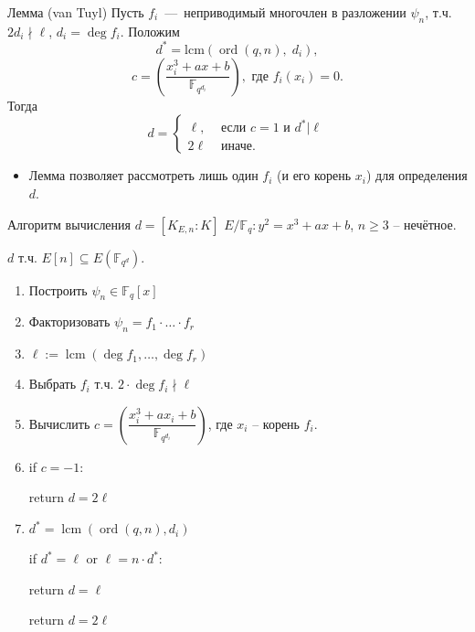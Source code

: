 \documentclass{beamer}
\begin{document}
\begin{frame}%
\begin{block}{Лемма (van Tuyl)}
    Пусть $f_i$~---~неприводимый многочлен в разложении ${\psi _n}$, т.ч. $2 d_i \nmid \ell$, $d_i = \deg f_i$. Положим
    \[
    {d^*} = \mathrm{lcm}( {\operatorname{ord} ( {q,n} ),\;{d_i}} ),
    \]
    \[
    c = \left(\frac{x_i^3 + a x + b}{\mathbb{F}_{q^{d_i}}} \right),{\text{ где }} f_i( x_i ) = 0.
    \]
    Тогда
    $$
    d = 
    \begin{cases}
        \ell, &\text{ если } c=1 \text{ и } d^*| \ell  \\
        2\ell & \text{ иначе. }
    \end{cases}
    $$
\end{block}
\begin{itemize}
    \item Лемма позволяет рассмотреть лишь один $f_i$ (и его корень $x_i$) для определения $d$. 
\end{itemize}
\end{frame}

\begin{frame}{Алгоритм вычисления $d = [K_{E,n}:K]$}
     $ E/\mathbb{F}_q: y^2 = x^3 + a x + b$, $n \geqslant 3$ -- нечётное.
    
     $d$ т.ч. $E[n] \subseteq E(\mathbb{F}_{q^d})$.
    
    \begin{enumerate}
        \item Построить $\psi_n \in \mathbb{F}_q[x]$
        \item Факторизовать $\psi_n = {f_1} \cdot \ldots \cdot {f_r}$
        \item $\ell := \operatorname{lcm}(\deg{f_1}, \ldots, \deg{f_r})$
        \item Выбрать $f_i$ т.ч. $2 \cdot \deg {f_i} \nmid \ell$
        \item Вычислить $c = \left(\dfrac{x_i^3 + a {x_i} + b}{\mathbb{F}_{q^{d_i}}}\right)$, где $x_i$ -- корень $f_i$.
        
        \item if $c = - 1$:
        
        \quad return $d = 2\ell$
        
        \item ${d^*} = \operatorname{lcm}( \operatorname{ord} ({q,n}),{d_i})$
        
        if ${d^*} = \ell$ or $\ell = n \cdot {d^*}$:
        
        \quad return $d = \ell$
        
        return $d = 2\ell$ 
    \end{enumerate}
\end{frame}
\end{document}
